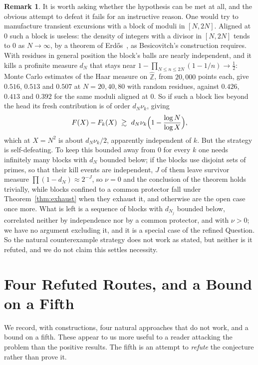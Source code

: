 \documentclass[11pt]{article}
\theoremstyle{plain}
\theoremstyle{definition}
\newtheorem{remark}[theorem]{Remark}
\newcommand{\Zhat}{\widehat{\mathbb{Z}}}
\begin{document}
\begin{remark}\label{rem:notvacuous}
It is worth asking whether the hypothesis can be met at all, and
the obvious attempt to defeat it fails for an instructive
reason.  One would try to manufacture transient excursions with a
block of moduli in $[N,2N]$.  Aligned at $0$ such a block is
useless: the density of integers with a divisor in $[N,2N]$
tends to $0$ as $N\to\infty$, by a theorem of
Erd\H{o}s~\cite{Er36}, as Besicovitch's construction requires.
With residues in general position the block's balls are nearly
independent, and it kills a profinite measure $d_N$ that stays
near $1-\prod_{N\le n\le2N}(1-1/n)\to\tfrac12$: Monte Carlo
estimates of the Haar measure on $\Zhat$, from $20{,}000$ points
each, give $0.516$, $0.513$ and $0.507$ at $N=20,40,80$ with
random residues, against $0.426$, $0.413$ and $0.392$ for the
same moduli aligned at $0$.  So if such a block lies beyond the head
its fresh contribution is of order $d_N\nu_k$, giving
\[
  F(X)-F_k(X)\ \gtrsim\ d_N\nu_k
  \Bigl(1-\frac{\log N}{\log X}\Bigr),
\]
which at $X=N^2$ is about $d_N\nu_k/2$, apparently independent
of $k$.  But the strategy is self-defeating.  To keep this
bounded away from $0$ for every $k$ one needs infinitely many
blocks with $d_N$ bounded below; if the blocks use disjoint
sets of primes, so that their kill events are independent, $J$
of them leave survivor measure $\prod(1-d_N)\approx2^{-J}$, so
$\nu=0$ and the conclusion of the theorem holds trivially, while
blocks confined to a common protector fall under
Theorem~\ref{thm:exhaust} when they exhaust it, and otherwise are
the open case once more.  What is left is a sequence of blocks
with $d_{N_j}$ bounded below, correlated neither by
independence nor by a common protector, and with $\nu>0$; we
have no argument excluding it, and it is a special case of the
refined Question.  So the natural counterexample strategy does
not work as stated, but neither is it refuted, and we do not
claim this settles necessity.
\end{remark}

\section{Four Refuted Routes, and a Bound on a Fifth}\label{sec:routes}

We record, with constructions, four natural approaches that do
not work, and a bound on a fifth.  These appear to us more useful
to a reader attacking the problem than the positive results.
The fifth is an attempt to \emph{refute} the conjecture rather
than prove it.
\end{document}
